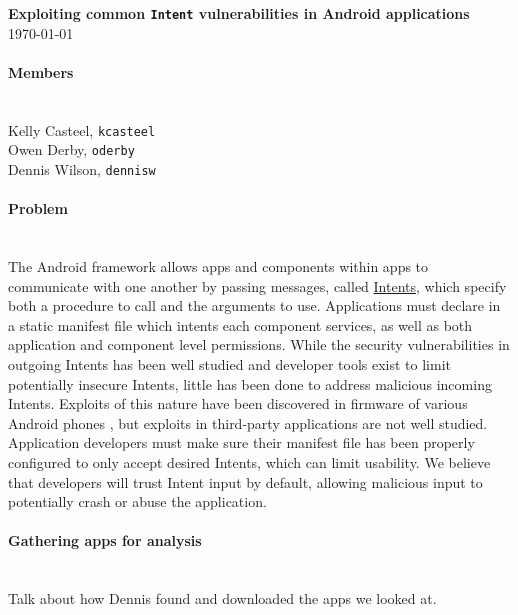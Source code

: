 \documentclass[12pt,a4paper]{article}
\begin{document}


\flushleft\textbf{Exploiting common \texttt{Intent} vulnerabilities in Android %
applications}\\
\today\\

\paragraph{Members} ~\\

Kelly Casteel, \texttt{kcasteel}\\
Owen Derby, \texttt{oderby}\\
Dennis Wilson, \texttt{dennisw}\\

\paragraph{Problem} ~\\

The Android framework allows apps and components within
apps to communicate with one another by passing messages, called
\href{https://developer.android.com/reference/android/content/Intent.html}{Intents},
which specify both a procedure to call and the arguments to use. Applications
must declare in a static manifest file which intents each component services, as
well as both application and component level permissions. While the security
vulnerabilities in outgoing Intents has been well studied
\cite{chin_analyzing_2011} and developer tools exist to limit potentially
insecure Intents, little has been done to address malicious incoming Intents.
Exploits of this nature have been discovered in firmware of various Android
phones \cite{grace_systematic_2012}, but exploits in third-party applications
are not well studied. Application developers must make sure their manifest file
has been properly configured to only accept desired Intents, which can limit
usability. We believe that developers will trust Intent input by default,
allowing malicious input to potentially crash or abuse the application.

\paragraph{Gathering apps for analysis} ~\\

Talk about how Dennis found and downloaded the apps we looked at.
\end{document}
